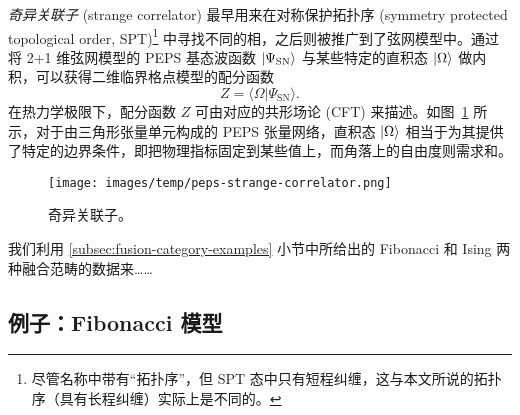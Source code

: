 \emph{奇异关联子} (strange correlator) 最早用来在对称保护拓扑序 (symmetry protected topological order, SPT)\footnote{尽管名称中带有“拓扑序”，但 SPT 态中只有短程纠缠，这与本文所说的拓扑序（具有长程纠缠）实际上是不同的。} 中寻找不同的相\cite{you2014wave}，之后则被推广到了弦网模型中\cite{vanhove2018mapping,lootens2019cardy,vanhove2022topological}。通过将 2+1 维弦网模型的 PEPS 基态波函数 $\ket{\Psi_\text{SN}}$ 与某些特定的直积态 $\ket{\Omega}$ 做内积，可以获得二维临界格点模型的配分函数
\begin{equation}
  Z = \langle\Omega|\Psi_\text{SN}\rangle.
\end{equation}
在热力学极限下，配分函数 $Z$ 可由对应的共形场论 (CFT) 来描述。如图~\ref{fig:peps-strange-correlator} 所示，对于由三角形张量单元构成的 PEPS 张量网络，直积态 $\ket{\Omega}$ 相当于为其提供了特定的边界条件，即把物理指标固定到某些值上，而角落上的自由度则需求和。

\begin{figure}[htb]
  \centering
  \texttt{[image: images/temp/peps-strange-correlator.png]}
  \caption[奇异关联子]{奇异关联子。}
  \label{fig:peps-strange-correlator}
\end{figure}

我们利用 \ref{subsec:fusion-category-examples} 小节中所给出的 Fibonacci 和 Ising 两种融合范畴的数据来……

\subsection{例子：Fibonacci 模型}
\label{subsec:strange-correlator-fib}


